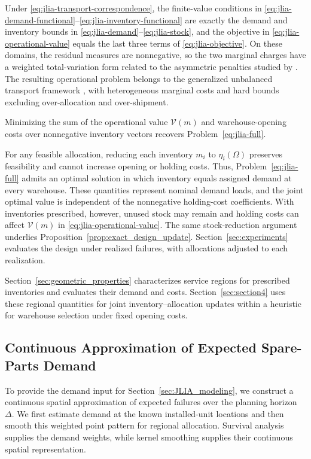 \documentclass[a4paper,fleqn]{cas-sc}
\theoremstyle{remark}
\theoremstyle{plain}
\begin{document}
Under \eqref{eq:jlia-transport-correspondence}, the finite-value conditions in \eqref{eq:jlia-demand-functional}--\eqref{eq:jlia-inventory-functional} are exactly the demand and inventory bounds in \eqref{eq:jlia-demand}--\eqref{eq:jlia-stock}, and the objective in \eqref{eq:jlia-operational-value} equals the last three terms of \eqref{eq:jlia-objective}. On these domains, the residual measures are nonnegative, so the two marginal charges have a weighted total-variation form related to the asymmetric penalties studied by \citet{chungunbalanced}. The resulting operational problem belongs to the generalized unbalanced transport framework \citep{piccoli2014generalized,piccoli2016properties}, with heterogeneous marginal costs and hard bounds excluding over-allocation and over-shipment.

Minimizing the sum of the operational value $\mathcal V(m)$ and warehouse-opening costs over nonnegative inventory vectors recovers Problem~\eqref{eq:jlia-full}.

For any feasible allocation, reducing each inventory $m_i$ to $\eta_i(\Omega)$ preserves feasibility and cannot increase opening or holding costs. Thus, Problem~\eqref{eq:jlia-full} admits an optimal solution in which inventory equals assigned demand at every warehouse. These quantities represent nominal demand loads, and the joint optimal value is independent of the nonnegative holding-cost coefficients. With inventories prescribed, however, unused stock may remain and holding costs can affect $\mathcal V(m)$ in \eqref{eq:jlia-operational-value}. The same stock-reduction argument underlies Proposition~\ref{prop:exact_design_update}. Section~\ref{sec:experiments} evaluates the design under realized failures, with allocations adjusted to each realization.

Section~\ref{sec:geometric_properties} characterizes service regions for prescribed inventories and evaluates their demand and costs. Section~\ref{sec:section4} uses these regional quantities for joint inventory--allocation updates within a heuristic for warehouse selection under fixed opening costs.

\subsection{Continuous Approximation of Expected Spare-Parts Demand}\label{sec:demand_reconstruction}

To provide the demand input for Section~\ref{sec:JLIA_modeling}, we construct a continuous spatial approximation of expected failures over the planning horizon $\Delta$. We first estimate demand at the known installed-unit locations and then smooth this weighted point pattern for regional allocation. Survival analysis supplies the demand weights, while kernel smoothing supplies their continuous spatial representation.
\end{document}
